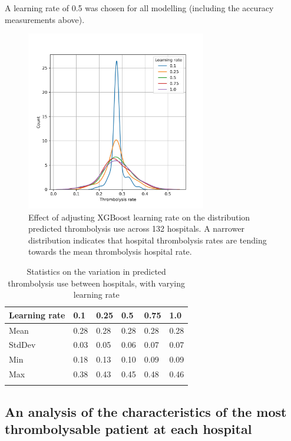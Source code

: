 A learning rate of 0.5 was chosen for all modelling (including the accuracy measurements above).

\begin{figure}
\centering
\includegraphics[width=0.7\textwidth]{./images/91_learning_rate}
\caption{Effect of adjusting XGBoost learning rate on the distribution predicted thrombolysis use across 132 hospitals. A narrower distribution indicates that hospital thrombolysis rates are tending towards the mean thrombolysis hospital rate.}
\label{fig:learning_rate}
\end{figure}

\begin{minipage}{\textwidth}
\begin{longtable}[]{@{}llllll@{}}
\caption{Statistics on the variation in predicted thrombolysis use between hospitals, with varying learning rate}\\
\toprule
Learning rate & 0.1 & 0.25 & 0.5 & 0.75 & 1.0\tabularnewline
\midrule
\endhead
Mean & 0.28 & 0.28 & 0.28 & 0.28 & 0.28\tabularnewline
StdDev & 0.03 & 0.05 & 0.06 & 0.07 & 0.07\tabularnewline
Min & 0.18 & 0.13 & 0.10 & 0.09 & 0.09\tabularnewline
Max & 0.38 & 0.43 & 0.45 & 0.48 & 0.46\tabularnewline
\bottomrule
\label{tab:learning_rate}
\end{longtable}
\end{minipage}

\subsection{An analysis of the characteristics of the most thrombolysable patient at each hospital}

